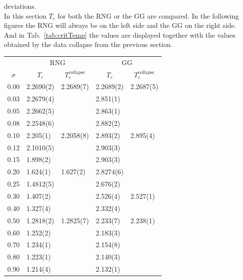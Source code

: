     deviations.\\
    In this section \(T_c\) for both the RNG or the GG are
    compared. In the following figures the RNG will always be on the
    left side and the GG on the right side.
    And in Tab.\ \ref{tab:critTemp} the values are displayed together with the
    values obtained by the data collapse from the previous section.
    \begin{table}[htbp]
        \center
        \begin{tabular}{l l l l l}
            \toprule
             & \multicolumn{2}{c}{RNG} & \multicolumn{2}{c}{GG}\\
            \cmidrule(rl){2-3} \cmidrule(rl){4-5}
            \multicolumn{1}{c}{\(\sigma\)} & \multicolumn{1}{c}{\(T_c\)} & \multicolumn{1}{c}{\(T_c^{\mathrm{collapse}}\)} & \multicolumn{1}{c}{\(T_c\)} & \multicolumn{1}{c}{\(T_c^{\mathrm{collapse}}\)}\\
            \midrule
            0.00 & 2.2690(2)& 2.2689(7)& 2.2689(2)& 2.2687(5)\\
            0.03 & 2.2679(4)&          & 2.851(1) &         \\
            0.05 & 2.2662(5)&          & 2.863(1) &         \\
            0.08 & 2.2548(6)&          & 2.882(2) &         \\
            0.10 & 2.205(1) & 2.2058(8)& 2.893(2) & 2.895(4)\\
            0.12 & 2.1010(5)&          & 2.903(3) &         \\
            0.15 & 1.898(2) &          & 2.903(3) &         \\
            0.20 & 1.624(1) & 1.627(2) & 2.8274(6)&         \\
            0.25 & 1.4812(5)&          & 2.676(2) &         \\
            0.30 & 1.407(2) &          & 2.526(4) & 2.527(1)\\
            0.40 & 1.327(4) &          & 2.332(4) &         \\
            0.50 & 1.2818(2)& 1.2825(7)& 2.233(7) & 2.238(1)\\
            0.60 & 1.252(2) &          & 2.183(3) &         \\
            0.70 & 1.234(1) &          & 2.154(8) &         \\
            0.80 & 1.223(1) &          & 2.140(3) &         \\
            0.90 & 1.214(4) &          & 2.132(1) &         \\

\end{tabular}
\end{table}
